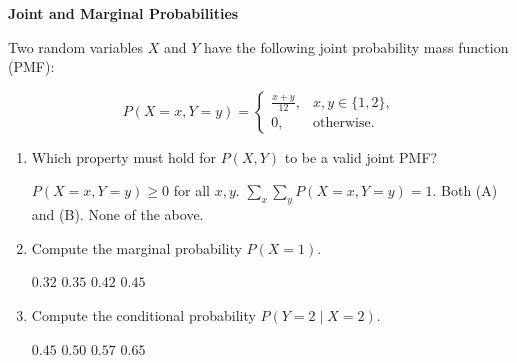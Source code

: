 \documentclass[12pt,letterpaper, onecolumn]{exam}
\begin{document}
\begin{questions}
\question[10 points]\textbf{Joint and Marginal Probabilities}\droppoints

Two random variables \( X \) and \( Y \) have the following joint probability mass function (PMF):

\[
P(X = x, Y = y) =
\begin{cases}
\frac{x + y}{12}, & x, y \in \{1, 2\}, \\
0, & \text{otherwise.}
\end{cases}
\]

\begin{enumerate}[label=(\alph*)]
    \item Which property must hold for \( P(X, Y) \) to be a valid joint PMF?
    \begin{choices}
        \choice \( P(X = x, Y = y) \geq 0 \) for all \( x, y \).
        \choice \( \sum_x \sum_y P(X = x, Y = y) = 1 \).
        \choice Both (A) and (B).
        \choice None of the above.
    \end{choices}

    \item Compute the marginal probability \( P(X = 1) \). 
    \begin{choices}
        \choice \( 0.32 \)
        \choice \( 0.35 \)
        \choice \( 0.42 \)
        \choice \( 0.45 \)
    \end{choices}

    \item Compute the conditional probability \( P(Y = 2 \mid X = 2) \).
    \begin{choices}
        \choice \( 0.45 \)
        \choice \( 0.50 \)
        \choice \( 0.57 \)
        \choice \( 0.65 \)
    \end{choices}
\end{enumerate}

\begin{solution}
    \begin{parts}
        \part 
        \part 
        \part 
    \end{parts}
\end{solution}


\end{questions}
\end{document}
